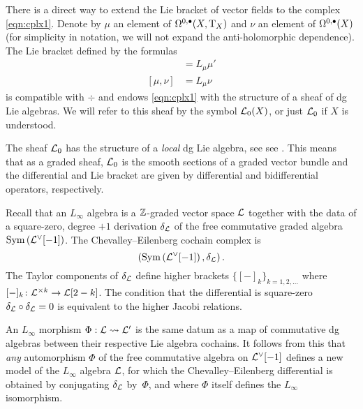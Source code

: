 There is a direct way to extend the Lie bracket of vector fields to the complex \eqref{eqn:cplx1}. 
Denote by $\mu$ an element of $\Omega^{0,\bullet}(X , {\rm T}_X)$ and $\nu$ an element of $\Omega^{0,\bullet}(X)$ (for simplicity in notation, we will not expand the anti-holomorphic dependence). 
The Lie bracket defined by the formulas
\begin{align*}
[\mu, \mu'] & = L_\mu \mu' \\
[\mu, \nu] & = L_\mu \nu 
\end{align*}
is compatible with $\div$ and endows \eqref{eqn:cplx1} with the structure of a sheaf of dg Lie algebras.
We will refer to this sheaf by the symbol $\mathcal L_0(X)$, or just $\mathcal L_0$ if $X$ is understood. 

The sheaf $\mathcal L_0$ has the structure of a {\em local} dg Lie algebra, see see \cite[\S 3.1.3]{CG2}.
This means that as a graded sheaf, $\mathcal L_0$ is the smooth sections of a graded vector bundle and the differential and Lie bracket are given by differential and bidifferential operators, respectively.



Recall that an $L_\infty$ algebra is a $\mathbb Z$-graded vector space $\mathcal L$ together with the data of a square-zero, degree $+1$ derivation $\delta_\mathcal L$ of the free commutative graded algebra $\operatorname{Sym}\left(\mathcal L^\vee [-1] \right)$. 
The Chevalley--Eilenberg cochain complex is 
\[
\left(\operatorname{Sym}\left(\mathcal L^\vee [-1] \right), \delta_\mathcal L\right) .
\]
The Taylor components of $\delta_\mathcal L$ define higher brackets $\{[-]_k\}_{k=1,2,\ldots}$ where $[-]_k \colon \mathcal L^{\times k} \to \mathcal L[2-k]$. 
The condition that the differential is square-zero $\delta_\mathcal L \circ \delta_\mathcal L = 0$ is equivalent to the higher Jacobi relations.

An $L_\infty$ morphism $\Phi: \mathcal L \rightsquigarrow \mathcal L'$ is the same datum as a map of commutative dg algebras 
between their respective Lie algebra cochains. It follows from this that \emph{any} automorphism $\Phi$ of the free commutative algebra on $\mathcal L^\vee[-1]$ defines a new model of the $L_\infty$ algebra $\mathcal L$, for which the Chevalley--Eilenberg differential is obtained by conjugating $\delta_\mathcal L$ by~$\Phi$, and where $\Phi$ itself defines the $L_\infty$ isomorphism.

